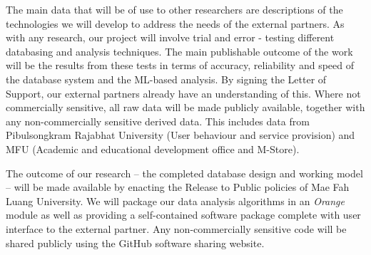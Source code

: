 \documentclass[11pt]{article}
\begin{document}
\vspace{2mm}
\noindent
The main data that will be of use to other researchers are descriptions of the technologies we will develop to address the needs of the external partners. As with any research, our project will involve trial and error - testing different databasing and analysis techniques. The main publishable outcome of the work will be the results from these tests in terms of accuracy, reliability and speed of the database system and the ML-based analysis. By signing the Letter of Support, our external partners already have an understanding of this. Where not commercially sensitive, all raw data will be made publicly available, together with any non-commercially sensitive derived data. This includes data from Pibulsongkram Rajabhat University (User behaviour and service provision) and MFU (Academic and educational development office and M-Store).

\vspace{2mm}
\noindent
 The outcome of our research  -- the completed database design and working model -- will be made available by enacting the Release to Public policies of Mae Fah Luang University. We will package our data analysis algorithms in an {\it Orange} module as well as providing a self-contained software package complete with user interface to the external partner. Any non-commercially sensitive code will be shared publicly using the GitHub software sharing website.




\end{document}
